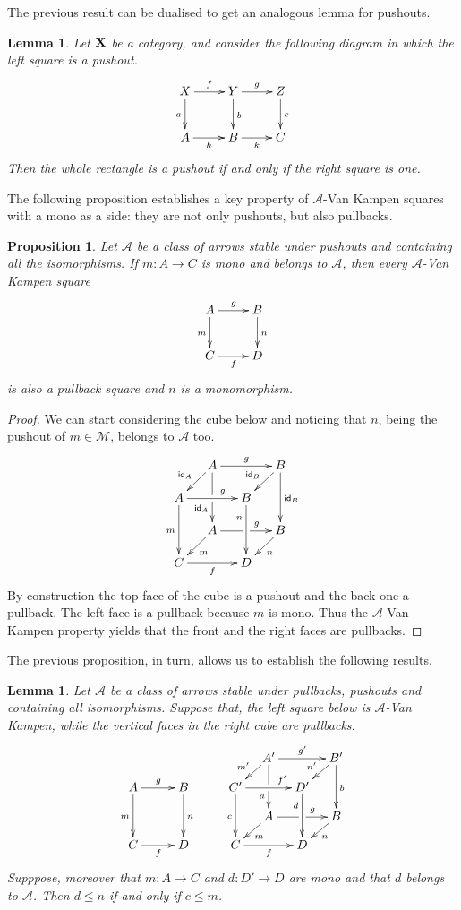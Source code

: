 \documentclass[a4paper]{article}
\newcommand{\id}[1]{\mathsf{id}_{#1}}
\def\C{\textbf {\textup{C}}}
\def\X{\textbf {\textup{X}}}
\newtheorem{proposition}[theorem]{Proposition}
\newtheorem{lemma}[theorem]{Lemma}
\theoremstyle{definition}
\begin{document}
The previous result can be dualised to get an analogous lemma for pushouts.

\begin{lemma}\label{lem:po1}
	Let $\X$ be a category, and consider the following diagram 	in which the left square is a pushout.
	\[\xymatrix{X \ar[d]_{a} \ar[r]^{f}& \ar[r]^{g} Y \ar[d]^{b}& Z \ar[d]^{c}\\ A \ar[r]_{h}& B \ar[r]_{k}& C}\]
	Then the whole rectangle is a pushout if and only if the right square is one.
\end{lemma}

The following proposition establishes a key property of $\mathcal{A}$-Van Kampen squares with a mono as a side: they are not only pushouts, but also pullbacks.
\begin{proposition}\label{prop:pbpo} Let $\mathcal{A}$ be a class of arrows stable under pushouts and containing all the isomorphisms.  If $m\colon A\to C$ is mono and belongs to $\mathcal{A}$, then every $\mathcal{A}$-Van Kampen square
	\[\xymatrix{A\ar[r]^{g} \ar[d]_{m} & B \ar[d]^{n} \\ C \ar[r]_{f}  & D}\]
	is also a pullback square and $n$ is a monomorphism.
\end{proposition}
\begin{proof} We can start considering the cube below and noticing that $n$, being the pushout of $m\in \mathcal{M}$, belongs to $\mathcal{A}$ too.
	\[\xymatrix@C=13pt@R=13pt{&A\ar[dd]|\hole_(.65){\id{A}}\ar[rr]^{g} \ar[dl]_{\id{A}} && B \ar[dd]^{\id{B}} \ar[dl]_{\id{B}} \\ A  \ar[dd]_{m}\ar[rr]^(.65){g} & & B \ar[dd]_(.3){n}\\&A\ar[rr]|\hole^(.65){g} \ar[dl]^{m} && B \ar[dl]^{n} \\C \ar[rr]_{f} & & D}\]
	By construction the top face of the cube is a pushout and the back one a pullback. The left face is a pullback because $m$ is mono. Thus the $\mathcal{A}$-Van Kampen property yields that the front and the right faces are pullbacks. 
\end{proof}

The previous proposition, in turn, allows us to establish the following results.
\begin{lemma}\label{lem:varie}Let $\mathcal{A}$ be a class of arrows stable under pullbacks, pushouts and containing all isomorphisms.  Suppose that, the left square below is $\mathcal{A}$-Van Kampen, while the vertical faces in the right cube are pullbacks.
		\[\xymatrix@C=10pt@R=10pt{&&&&&A'\ar[dd]|\hole_(.65){a}\ar[rr]^{g'} \ar[dl]_{m'} && B' \ar[dd]^{b} \ar[dl]_{n'} \\ A \ar[dd]_{m}\ar[rr]^{g}&&B\ar[dd]^{n}&&C'  \ar[dd]_{c}\ar[rr]^(.7){f'} & & D' \ar[dd]_(.3){d}\\&&&&&A\ar[rr]|\hole^(.65){g} \ar[dl]^{m} && B \ar[dl]^{n} \\C\ar[rr]_{f} &&D&&C \ar[rr]_{f} & & D}\]
Supppose, moreover that $m:A\to C$ and $d:D'\to D$ are mono and that $d$ belongs to $\mathcal{A}$. Then $d\leq n$ if and only if $c \leq m$.
\end{lemma}
\end{document}
